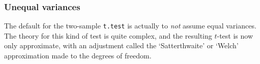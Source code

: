 \documentclass[]{book}
\newenvironment{Shaded}{\begin{snugshade}}{\end{snugshade}}
\newcommand{\DataTypeTok}[1]{\textcolor[rgb]{0.13,0.29,0.53}{#1}}
\newcommand{\KeywordTok}[1]{\textcolor[rgb]{0.13,0.29,0.53}{\textbf{#1}}}
\newcommand{\NormalTok}[1]{#1}
\newcommand{\OperatorTok}[1]{\textcolor[rgb]{0.81,0.36,0.00}{\textbf{#1}}}
\newcommand{\StringTok}[1]{\textcolor[rgb]{0.31,0.60,0.02}{#1}}
\begin{document}
\hypertarget{unequal-variances}{%
\subsubsection{Unequal variances}\label{unequal-variances}}

The default for the two-sample \texttt{t.test} is actually to \emph{not} assume equal variances. The theory for this kind of test is quite complex, and the resulting \(t\)-test is now only approximate, with an adjustment called the `Satterthwaite' or `Welch' approximation made to the degrees of freedom.

\begin{Shaded}
\end{Shaded}
\end{document}
